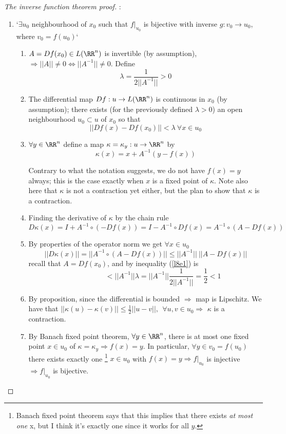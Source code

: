 \begin{proof}[The inverse function theorem proof]
  \par :
  \begin{enumerate}[I]
  \item `$\exists u_0$ neighbourhood of $x_0$ such that $f|_{u_0}$ is bijective with inverse $g: v_0 \rightarrow u_0$, where $v_0 = f(u_0)$`
    \begin{enumerate}
    \item $A = Df(x_0) \in L(\RR^n)$ is invertible (by assumption), $\Rightarrow ||A|| \neq 0 \iff ||A^{-1}|| \neq 0$. Define
      $$\lambda = \frac{1}{2||A^{-1}||} > 0$$
    \item The differential map $Df: u \rightarrow L(\RR^n)$ is continuous in $x_0$ (by assumption); there exists (for the previously defined $\lambda > 0$) an open neighbourhood $u_0 \subset u$ of $x_0$ so that
      \begin{equation}
        \label{l8e1}
        ||Df(x) - Df(x_0)|| < \lambda \: \forall x \in u_0
        \end{equation}
    \item $\forall y \in \RR^n$ define a map $\kappa = \kappa_y: u \rightarrow \RR^n$ by
      \begin{equation}
        \label{l8e2}
        \kappa(x) = x + A^{-1}(y - f(x))
      \end{equation}
      \begin{rem}
        Contrary to what the notation suggests, we do not have $f(x) = y$ always; this is the case exactly when $x$ is a fixed point of $\kappa$. Note also here that $\kappa$ is not a contraction yet either, but the plan to show that $\kappa$ is a contraction.
      \end{rem}
    \item Finding the derivative of $\kappa$ by the chain rule
      $$D\kappa(x) = I + A^{-1}\circ(-Df(x)) = I - A^{-1}\circ Df(x) = A^{-1} \circ(A-Df(x))$$
    \item By properties of the operator norm we get $\forall x \in u_0$
      $$||D\kappa(x)|| = ||A^{-1} \circ(A-Df(x))|| \leq ||A^{-1}||\:||A-Df(x)||$$
      recall that $A = Df(x_0)$, and by inequality (\ref{l8e1}) is
      $$\phantom{||D\kappa(x)||} < ||A^{-1}||\lambda = ||A^{-1}||\frac{1}{2||A^{-1}||}=\frac{1}{2} < 1$$
    \item By proposition, since the differential is bounded $\Rightarrow$ map is Lipschitz. We have that $||\kappa(u) - \kappa(v)|| \leq \frac{1}{2}||u-v||, \:\:\forall u,v \in u_0 \Rightarrow $ $\kappa$ is a contraction.
    \item By Banach fixed point theorem, $\forall y \in \RR^n$, there is at most one fixed point $x\in u_0$ of $\kappa = \kappa_y \Rightarrow f(x) = y$. In particular, $\forall y \in v_0 = f(u_0)$ there exists exactly one \footnote{Banach fixed point theorem says that this implies that there exists \emph{at most one} x, but I think it's exactly one since it works for all $y$.} $x \in u_0$ with $f(x) = y \Rightarrow f|_{u_0}$ is injective $\Rightarrow f|_{u_0}$ is bijective.
    \end{enumerate}
    

\end{enumerate}
\end{proof}
